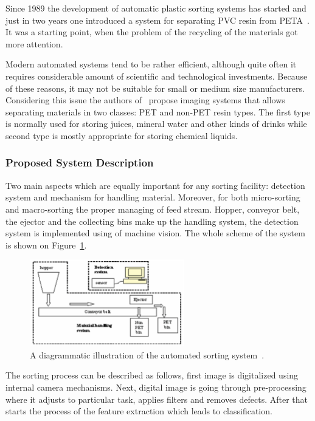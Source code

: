 \documentclass{lutmscthesis}[2010/09/22]
\begin{document}
Since 1989 the development of automatic plastic sorting systems
has started and just in two years one introduced a system for separating
PVC resin from PETA~\cite{Wahab:2006}. It was a starting point, when the problem
of the recycling of the materials got more attention.

Modern automated systems tend to be rather efficient, although
quite often it requires considerable amount of scientific and
technological investments. Because of these reasons, it may not
be suitable for small or medium size manufacturers. Considering this
issue the authors of~\cite{Wahab:2006} propose imaging systems
that allows separating materials in two classes: PET and non-PET
resin types. The first type is normally used for storing
juices, mineral water and other kinds of drinks while
second type is mostly appropriate for storing chemical
liquids.

\subsubsection*{ Proposed System Description }
Two main aspects which are equally important for any sorting
facility: detection system and mechanism for handling material.
Moreover, for both micro-sorting and macro-sorting
the proper managing of feed stream. Hopper, conveyor belt, the ejector
and the collecting bins make up the handling system,
the detection system is implemented using of machine vision.
The whole scheme of the system is shown on
Figure~\ref{afig:scheme_plastic}.

\begin{figure}[htp]
  {\par\centering
  \includegraphics[width=0.60\textwidth]{scheme-plastic}
  \par}
  \caption{A diagrammatic illustration of the automated sorting system~\cite{Wahab:2006}.}
  \label{afig:scheme_plastic}
\end{figure}

The sorting process can be described as follows, first
image is digitalized using internal camera mechanisms.
Next, digital image is going through pre-processing
where it adjusts to particular task, applies filters
and removes defects. After that starts the process
of the feature extraction which leads to classification.
\end{document}
